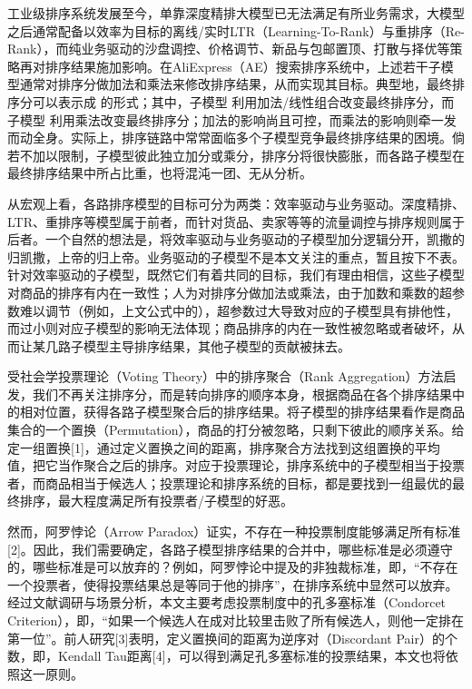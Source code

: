 工业级排序系统发展至今，单靠深度精排大模型已无法满足有所业务需求，大模型之后通常配备以效率为目标的离线/实时LTR（Learning-To-Rank）与重排序（Re-Rank），而纯业务驱动的沙盘调控、价格调节、新品与包邮置顶、打散与择优等策略再对排序结果施加影响。在AliExpress（AE）搜索排序系统中，上述若干子模型通常对排序分做加法和乘法来修改排序结果，从而实现其目标。典型地，最终排序分可以表示成
的形式；其中，子模型
利用加法/线性组合改变最终排序分，而子模型
利用乘法改变最终排序分；加法的影响尚且可控，而乘法的影响则牵一发而动全身。实际上，排序链路中常常面临多个子模型竞争最终排序结果的困境。倘若不加以限制，子模型彼此独立加分或乘分，排序分将很快膨胀，而各路子模型在最终排序结果中所占比重，也将混沌一团、无从分析。

从宏观上看，各路排序模型的目标可分为两类：效率驱动与业务驱动。深度精排、LTR、重排序等模型属于前者，而针对货品、卖家等等的流量调控与排序规则属于后者。一个自然的想法是，将效率驱动与业务驱动的子模型加分逻辑分开，凯撒的归凯撒，上帝的归上帝。业务驱动的子模型不是本文关注的重点，暂且按下不表。针对效率驱动的子模型，既然它们有着共同的目标，我们有理由相信，这些子模型对商品的排序有内在一致性；人为对排序分做加法或乘法，由于加数和乘数的超参数难以调节（例如，上文公式中的），超参数过大导致对应的子模型具有排他性，而过小则对应子模型的影响无法体现；商品排序的内在一致性被忽略或者破坏，从而让某几路子模型主导排序结果，其他子模型的贡献被抹去。

受社会学投票理论（Voting Theory）中的排序聚合（Rank Aggregation）方法启发，我们不再关注排序分，而是转向排序的顺序本身，根据商品在各个排序结果中的相对位置，获得各路子模型聚合后的排序结果。将子模型的排序结果看作是商品集合的一个置换（Permutation），商品的打分被忽略，只剩下彼此的顺序关系。给定一组置换[1]，通过定义置换之间的距离，排序聚合方法找到这组置换的平均值，把它当作聚合之后的排序。对应于投票理论，排序系统中的子模型相当于投票者，而商品相当于候选人；投票理论和排序系统的目标，都是要找到一组最优的最终排序，最大程度满足所有投票者/子模型的好恶。

然而，阿罗悖论（Arrow Paradox）证实，不存在一种投票制度能够满足所有标准[2]。因此，我们需要确定，各路子模型排序结果的合并中，哪些标准是必须遵守的，哪些标准是可以放弃的？例如，阿罗悖论中提及的非独裁标准，即，“不存在一个投票者，使得投票结果总是等同于他的排序”，在排序系统中显然可以放弃。经过文献调研与场景分析，本文主要考虑投票制度中的孔多塞标准（Condorcet Criterion），即，“如果一个候选人在成对比较里击败了所有候选人，则他一定排在第一位”。前人研究[3]表明，定义置换间的距离为逆序对（Discordant Pair）的个数，即，Kendall Tau距离[4]，可以得到满足孔多塞标准的投票结果，本文也将依照这一原则。

